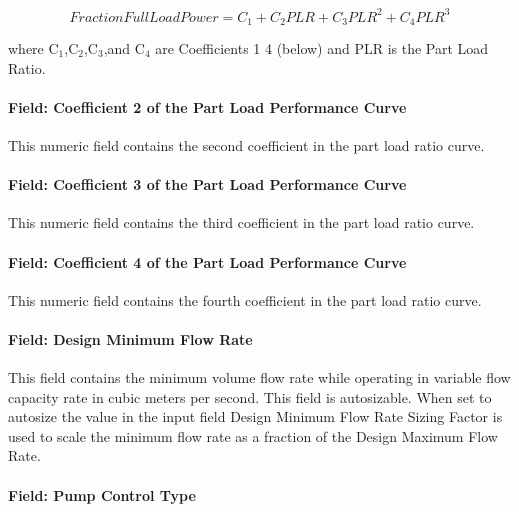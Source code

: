 \begin{equation}
FractionFullLoadPower = {C_1} + {C_2}PLR + {C_3}PL{R^2} + {C_4}PL{R^3}
\end{equation}

where C\(_{1}\),C\(_{2}\),C\(_{3}\),and C\(_{4}\) are Coefficients 1 4 (below) and PLR is the Part Load Ratio.

\paragraph{Field: Coefficient 2 of the Part Load Performance Curve}\label{field-coefficient-2-of-the-part-load-performance-curve}

This numeric field contains the second coefficient in the part load ratio curve.

\paragraph{Field: Coefficient 3 of the Part Load Performance Curve}\label{field-coefficient-3-of-the-part-load-performance-curve}

This numeric field contains the third coefficient in the part load ratio curve.

\paragraph{Field: Coefficient 4 of the Part Load Performance Curve}\label{field-coefficient-4-of-the-part-load-performance-curve}

This numeric field contains the fourth coefficient in the part load ratio curve.

\paragraph{Field: Design Minimum Flow Rate}\label{field-design-minimum-flow-rate}

This field contains the minimum volume flow rate while operating in variable flow capacity rate in cubic meters per second. This field is autosizable. When set to autosize the value in the input field Design Minimum Flow Rate Sizing Factor is used to scale the minimum flow rate as a fraction of the Design Maximum Flow Rate.

\paragraph{Field: Pump Control Type}\label{field-pump-control-type-000}


